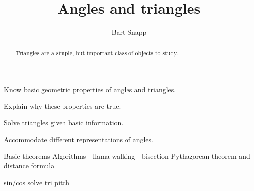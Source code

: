 \documentclass[handout,nooutcomes,noauthor]{ximera}
\title{Angles and triangles}
\author{Bart Snapp}
\begin{document}
\begin{abstract}
  Triangles are a simple, but important class of objects to study.
\end{abstract}
\maketitle


\begin{listSectionOutcomes}
\item Know basic geometric properties of angles and triangles.
\item Explain why these properties are true.
\item Solve triangles given basic information.
\item Accommodate different representations of angles.
\end{listSectionOutcomes}


Basic theorems
Algorithms
- llama walking
- bisection
Pythagorean theorem and distance formula

sin/cos
solve tri
pitch
\end{document}
